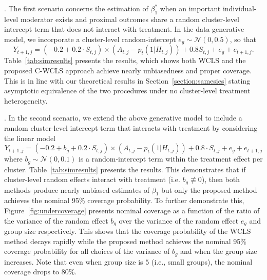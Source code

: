 \documentclass[12pt]{article}
\newcommand{\zw}[1]{\textcolor{blue}{[\textit{ZW: #1}]}}
\newcommand{\hs}[3]{\textcolor{red}{[\textit{HS: #1}]}}
\begin{document}

. The first scenario concerns the estimation of $\beta_1^*$ when an important individual-level moderator exists and proximal outcomes share a random cluster-level intercept term that does not interact with treatment. In the data generative model, we incorporate a cluster-level random-intercept $e_g \sim \mathcal{N}(0,0.5)$, so that
\begin{equation*}
Y_{t+1,j} = (-0.2 + 0.2 \cdot S_{t,j}) \times (A_{t,j} -p_t(1|H_{t,j})) + 0.8 S_{t,j} + e_g +e_{t+1,j}.
\end{equation*}
Table~\ref{tab:simresults} presents the results, which shows both WCLS and the proposed C-WCLS approach achieve nearly unbiasedness and proper coverage. This is in line with our theoretical results in    Section~\ref{section:samesies} stating asymptotic equivalence of the two procedures under no cluster-level treatment heterogeneity.

. In the second scenario, we extend the above generative model to include a random cluster-level intercept term that interacts with treatment by considering the linear model
\begin{equation}
Y_{t+1,j} = (-0.2 + b_g +  0.2 \cdot S_{t,j}) \times (A_{t,j} -p_t(1|H_{t,j})) + 0.8 \cdot S_{t,j} + e_g + e_{t+1,j}
\end{equation}
where $b_g \sim \mathcal{N}(0,0.1)$ is a random-intercept term within the treatment effect per cluster. Table~\ref{tab:simresults} presents the results.  This demonstrates that if cluster-level random effects interact with treatment  (i.e. $b_g \not \equiv 0$), then both methods produce nearly unbiased estimates of $\beta_1$ but only the proposed method achieves the nominal 95\% coverage probability. To further demonstrate this, Figure~\ref{fig:undercoverage} presents nominal coverage as a function of the ratio of the variance of the random effect $b_g$ over the variance of the random effect $e_g$ and group size respectively.  This shows that the coverage probability of the WCLS method decays rapidly while the proposed method achieves the nominal 95\% coverage probability for all choices of the variance of $b_g$ and when the group size increases.  Note that even when group size is $5$ (i.e., small groups), the nominal coverage drops to 80\%.
\end{document}
